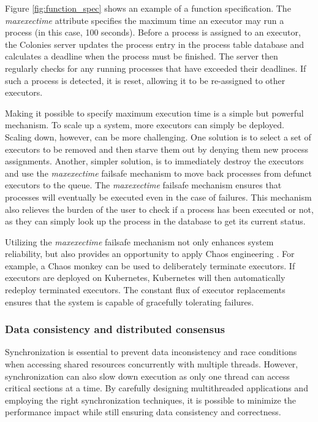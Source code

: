 \documentclass{article}
\begin{document}
Figure \ref{fig:function_spec} shows an example of a function specification. The \emph{maxexectime} attribute specifies the maximum time an executor may run a process (in this case, 100 seconds). Before a process is assigned to an executor, the Colonies server updates the process entry in the process table database and calculates a deadline when the process must be finished. The server then regularly checks for any running processes that have exceeded their deadlines. If such a process is detected, it is reset, allowing it to be re-assigned to other executors. 

Making it possible to specify maximum execution time is a simple but powerful mechanism. To scale up a system, more executors can simply be deployed. Scaling down, however, can be more challenging. One solution is to select a set of executors to be removed and then starve them out by denying them new process assignments. Another, simpler solution, is to immediately destroy the executors and use the \emph{maxexectime} failsafe mechanism to move back processes from defunct executors to the queue. The \emph{maxexectime} failsafe mechanism ensures that processes will eventually be executed even in the case of failures. This mechanism also relieves the burden of the user to check if a process has been executed or not, as they can simply look up the process in the database to get its current status. 

Utilizing the \emph{maxexectime} failsafe mechanism not only enhances system reliability, but also provides an opportunity to apply Chaos engineering \cite{chaos_engineering}. For example, a Chaos monkey can be used to deliberately terminate executors. If executors are deployed on Kubernetes, Kubernetes will then automatically redeploy terminated executors. The constant flux of executor replacements ensures that the system is capable of gracefully tolerating failures.

\subsubsection{Data consistency and distributed consensus}
Synchronization is essential to prevent data inconsistency and race conditions when accessing shared resources concurrently with multiple threads. However, synchronization can also slow down execution as only one thread can access critical sections at a time. By carefully designing multithreaded applications and employing the right synchronization techniques, it is possible to minimize the performance impact while still ensuring data consistency and correctness.  
\end{document}
